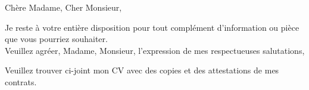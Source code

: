 %
%

\renewcommand{\labelitemii}{$\bullet$}

\opening{Chère Madame, Cher Monsieur,}
\closing{Je reste à votre entière disposition pour tout complément d'information ou pièce que vous pourriez souhaiter.\\
Veuillez agréer, Madame, Monsieur, l’expression de mes respectueuses salutations,}
\makelettertitle

Veuillez trouver ci-joint mon CV avec des copies et des attestations de mes contrats.

